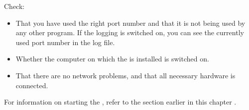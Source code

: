 % 
%
%
Check:
\begin{itemize}
\item That you have used the right port number and that it is not being used by any other program. If the \gdagent logging is switched on, you can see the currently used port number in the log file.
\item Whether the computer on which the \gdagent is installed is switched on.
\item That there are no network problems, and that all necessary hardware is connected. 
\end{itemize}

For information on starting the \gdagent, refer to the section earlier in this chapter . 










